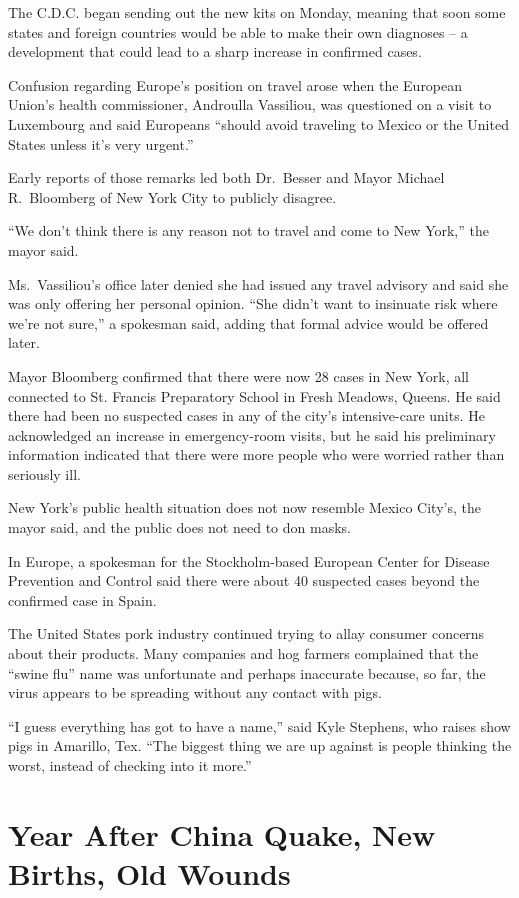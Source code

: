 \documentclass[12pt,a4paper,onecolumn]{article}
\begin{document}
The C.D.C. began sending out the new kits on Monday, meaning that soon some states and foreign
countries would be able to make their own diagnoses -- a development that could lead to a sharp
increase in confirmed cases.

Confusion regarding Europe's position on travel arose when the European Union's health commissioner,
Androulla Vassiliou, was questioned on a visit to Luxembourg and said Europeans ``should avoid
traveling to Mexico or the United States unless it's very urgent.''

Early reports of those remarks led both Dr.~Besser and Mayor Michael R.~Bloomberg of New York City
to publicly disagree.

``We don't think there is any reason not to travel and come to New York,'' the mayor said.

Ms.~Vassiliou's office later denied she had issued any travel advisory and said she was only
offering her personal opinion. ``She didn't want to insinuate risk where we're not sure,'' a
spokesman said, adding that formal advice would be offered later.

Mayor Bloomberg confirmed that there were now 28 cases in New York, all connected to St. Francis
Preparatory School in Fresh Meadows, Queens. He said there had been no suspected cases in any of the
city's intensive-care units. He acknowledged an increase in emergency-room visits, but he said his
preliminary information indicated that there were more people who were worried rather than seriously
ill.

New York's public health situation does not now resemble Mexico City's, the mayor said, and the
public does not need to don masks.

In Europe, a spokesman for the Stockholm-based European Center for Disease Prevention and Control
said there were about 40 suspected cases beyond the confirmed case in Spain.

The United States pork industry continued trying to allay consumer concerns about their products.
Many companies and hog farmers complained that the ``swine flu'' name was unfortunate and perhaps
inaccurate because, so far, the virus appears to be spreading without any contact with pigs.

``I guess everything has got to have a name,'' said Kyle Stephens, who raises show pigs in Amarillo,
Tex. ``The biggest thing we are up against is people thinking the worst, instead of checking into it
more.''

\section{Year After China Quake, New Births, Old Wounds}
\end{document}
